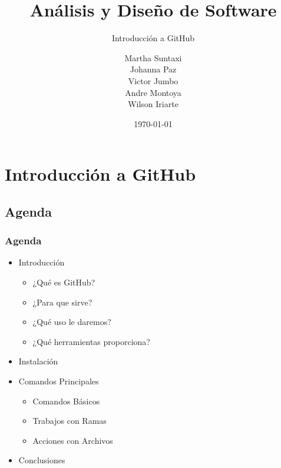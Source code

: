 \documentclass{beamer}
\title{Análisis y Diseño de Software}
\subtitle{Introducción a GitHub}
\author[Grupo1]{
Martha Suntaxi\\Johanna Paz\\Victor Jumbo\\Andre Montoya\\Wilson Iriarte
}
\date{\today}
\institute{Ingeniería en Sistemas\\}
\begin{document}
	
	\begin{frame}[plain,t]
		\titlepage
	\end{frame}

	\section{Introducción a GitHub}

\subsection{Agenda}
\begin{frame}
\frametitle{Agenda}
{\small
\begin{itemize}
\item Introducción
	\begin{itemize}
	\item ¿Qué es GitHub?
	\item ¿Para que sirve?
	\item ¿Qué uso le daremos?
	\item ¿Qué herramientas proporciona?
	\end{itemize}
\item Instalación
\item Comandos Principales
	\begin{itemize}
	\item Comandos Básicos
	\item Trabajos con Ramas
	\item Acciones con Archivos
	\end{itemize}
\item Conclusiones
\end{itemize}}
\end{frame}
\end{document}
